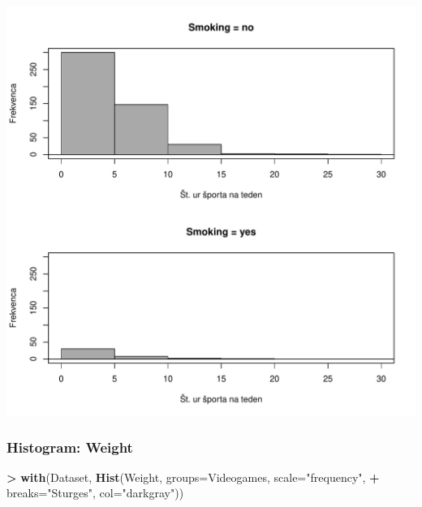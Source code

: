 \documentclass[
]{article}
\newenvironment{Shaded}{\begin{snugshade}}{\end{snugshade}}
\newcommand{\AttributeTok}[1]{\textcolor[rgb]{0.13,0.29,0.53}{#1}}
\newcommand{\FunctionTok}[1]{\textcolor[rgb]{0.13,0.29,0.53}{\textbf{#1}}}
\newcommand{\NormalTok}[1]{#1}
\newcommand{\SpecialCharTok}[1]{\textcolor[rgb]{0.81,0.36,0.00}{\textbf{#1}}}
\newcommand{\StringTok}[1]{\textcolor[rgb]{0.31,0.60,0.02}{#1}}
\begin{document}
\includegraphics[width=750px]{RcmdrMarkdown_files/figure-latex/unnamed-chunk-12-1}

\subsubsection{Histogram: Weight}\label{histogram-weight}

\begin{Shaded}
\begin{Highlighting}[]
\SpecialCharTok{\textgreater{}} \FunctionTok{with}\NormalTok{(Dataset, }\FunctionTok{Hist}\NormalTok{(Weight, }\AttributeTok{groups=}\NormalTok{Videogames, }\AttributeTok{scale=}\StringTok{"frequency"}\NormalTok{, }
\SpecialCharTok{+}   \AttributeTok{breaks=}\StringTok{"Sturges"}\NormalTok{, }\AttributeTok{col=}\StringTok{"darkgray"}\NormalTok{))}
\end{Highlighting}
\end{Shaded}
\end{document}
